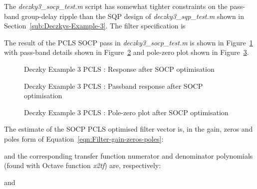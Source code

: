 \documentclass[a4paper,twoside,10pt,english]{report}
\begin{document}
The \emph{deczky3\_socp\_test.m} script has somewhat tighter constraints on the
pass-band group-delay ripple than the SQP design of \emph{deczky3\_sqp\_test.m}
shown in Section~\ref{sub:Deczkys-Example-3}. The filter specification is
\begin{small}

\end{small}
The result of the PCLS SOCP pass in \emph{deczky3\_socp\_test.m} is shown in
Figure~\ref{fig:SOCP-Deczky-Example-3-PCLS-d2} with pass-band details
shown in Figure~\ref{fig:SOCP-Deczky-Example-3-PCLS-d2-passband} and 
pole-zero plot shown in Figure~\ref{fig:SOCP-Deczky-Example-3-PCLS-d2-pz}.
\begin{figure}[!htbp]
\begin{center}
\scalebox{0.7}{}
\caption{Deczky Example 3 PCLS : Response after SOCP optimisation}
\label{fig:SOCP-Deczky-Example-3-PCLS-d2}
\end{center}
\end{figure}
\begin{figure}[!htbp]
\begin{center}
\scalebox{0.7}{}
\caption{Deczky Example 3 PCLS : Passband response after SOCP optimisation}
\label{fig:SOCP-Deczky-Example-3-PCLS-d2-passband}
\end{center}
\end{figure}
\begin{figure}[!htbp]
\begin{center}
\scalebox{0.7}{}
\caption{Deczky Example 3 PCLS : Pole-zero plot after SOCP optimisation}
\label{fig:SOCP-Deczky-Example-3-PCLS-d2-pz}
\end{center}
\end{figure}

The estimate of the SOCP PCLS optimised filter vector is, in the gain,
zeros and poles form of Equation~\ref{eqn:Filter-gain-zeros-poles}:
\begin{small}

\end{small}
and the corresponding transfer function numerator and denominator polynomials
(found with Octave function \emph{x2tf}) are, respectively:
\begin{small}

\end{small}
and
\begin{small}

\end{small}
\end{document}

